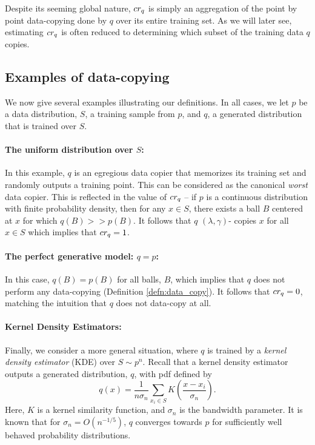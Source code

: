 Despite its seeming global nature, $cr_q$ is simply an aggregation of the point by point data-copying done by $q$ over its entire training set. As we will later see, estimating $cr_q$ is often reduced to determining which subset of the training data $q$ copies. 

\subsection{Examples of data-copying}

We now give several examples illustrating our definitions. In all cases, we let $p$ be a data distribution, $S$, a training sample from $p$, and $q$, a generated distribution that is trained over $S$. 

\paragraph{The uniform distribution over $S$:} In this example, $q$ is an egregious data copier that memorizes its training set and randomly outputs a training point. This can be considered as the canonical \textit{worst} data copier. This is reflected in the value of $cr_q$ -- if $p$ is a continuous distribution with finite probability density, then for any $x \in S$, there exists a ball $B$ centered at $x$ for which $q(B) >> p(B)$. It follows that $q$ $(\lambda,\gamma)$- copies $x$ for all $x \in S$ which implies that $cr_q = 1$.

\paragraph{The perfect generative model: $q = p$:} In this case, $q(B) = p(B)$ for all balls, $B$, which implies that $q$ does not perform any data-copying (Definition \ref{defn:data_copy}). It follows that $cr_q = 0$, matching the intuition that $q$ does not data-copy at all.

\paragraph{Kernel Density Estimators:} Finally, we consider a more general situation, where $q$ is trained by a \textit{kernel density estimator} (KDE) over $S \sim p^n$. Recall that a kernel density estimator outputs a generated distribution, $q$, with pdf defined by $$q(x) = \frac{1}{n\sigma_n}\sum_{x_i \in S} K\left(\frac{x - x_i}{\sigma_n}\right).$$ Here, $K$ is a kernel similarity function, and $\sigma_n$ is the bandwidth parameter. It is known that for $\sigma_n = O(n^{-1/5})$, $q$ converges towards $p$ for sufficiently well behaved probability distributions. 

